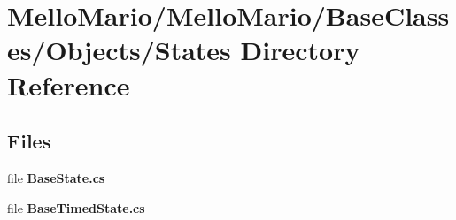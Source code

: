 \section{Mello\+Mario/\+Mello\+Mario/\+Base\+Classes/\+Objects/\+States Directory Reference}
\label{dir_96547780ef329ecebc8a94d43213ab96}
\subsection*{Files}
\begin{DoxyCompactItemize}
\item 
file \textbf{ Base\+State.\+cs}
\item 
file \textbf{ Base\+Timed\+State.\+cs}
\end{DoxyCompactItemize}
